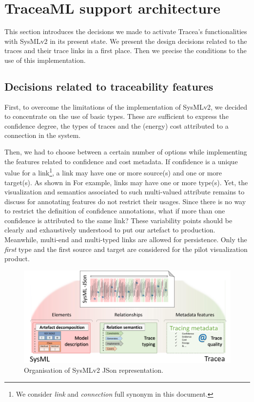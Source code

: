 \section{TraceaML support architecture}\label{sec:datastructure}

This section introduces the decisions we made to activate Tracea's functionalities with SysMLv2 in its present state. We present the design decisions related to the traces and their trace links in a first place. Then we precise the conditions to the use of this implementation. 


\subsection{Decisions related to traceability features}
First, to overcome the limitations of the implementation of SysMLv2, we decided to concentrate on the use of basic types. These are sufficient to express the confidence degree, the types of traces and the (energy) cost attributed to a connection in the system.

Then, we had to choose between a certain number of options while implementing the features related to confidence and cost metadata. If confidence is a unique value for a link\footnote{We consider \textit{link} and \textit{connection} full synonym in this document.}, a link may have one or more source(s) and one or more target(s). As shown in For example, links may have one or more type(s). Yet, the visualization and semantics associated to such multi-valued attribute remains to discuss for annotating features do not restrict their usages. Since there is no way to restrict the definition of confidence annotations, what if more than one confidence is attributed to the same link? These variability points should be clearly and exhaustively understood to put our artefact to production. Meanwhile, multi-end and multi-typed links are allowed for persistence. Only the \textit{first} type and the first source and target are considered for the pilot visualization product.
\begin{figure}[h]     
	\centering
	\includegraphics[width=.8\linewidth]{images/sysmljson-orga.pdf}
	\caption{Organisation of SysMLv2 JSon representation.}
	\label{fig:sysmljson-orga}
\end{figure}

